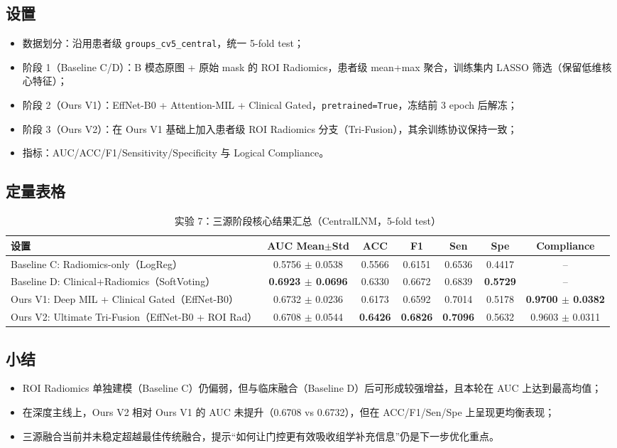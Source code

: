\documentclass[12pt,a4paper]{ctexart}
\begin{document}
\subsection{设置}
\begin{itemize}
  \item 数据划分：沿用患者级 \texttt{groups\_cv5\_central}，统一 5-fold test；
  \item 阶段 1（Baseline C/D）：B 模态原图 + 原始 mask 的 ROI Radiomics，患者级 mean+max 聚合，训练集内 LASSO 筛选（保留低维核心特征）；
  \item 阶段 2（Ours V1）：EffNet-B0 + Attention-MIL + Clinical Gated，\texttt{pretrained=True}，冻结前 3 epoch 后解冻；
  \item 阶段 3（Ours V2）：在 Ours V1 基础上加入患者级 ROI Radiomics 分支（Tri-Fusion），其余训练协议保持一致；
  \item 指标：AUC/ACC/F1/Sensitivity/Specificity 与 Logical Compliance。
\end{itemize}

\subsection{定量表格}
\begin{table}[H]
\centering
\caption{实验 7：三源阶段核心结果汇总（CentralLNM，5-fold test）}
\begin{tabular}{lcccccc}
\toprule
设置 & AUC Mean$\pm$Std & ACC & F1 & Sen & Spe & Compliance \\
\midrule
Baseline C: Radiomics-only（LogReg） & 0.5756 $\pm$ 0.0538 & 0.5566 & 0.6151 & 0.6536 & 0.4417 & -- \\
Baseline D: Clinical+Radiomics（SoftVoting） & \textbf{0.6923 $\pm$ 0.0696} & 0.6330 & 0.6672 & 0.6839 & \textbf{0.5729} & -- \\
Ours V1: Deep MIL + Clinical Gated（EffNet-B0） & 0.6732 $\pm$ 0.0236 & 0.6173 & 0.6592 & 0.7014 & 0.5178 & \textbf{0.9700 $\pm$ 0.0382} \\
Ours V2: Ultimate Tri-Fusion（EffNet-B0 + ROI Rad） & 0.6708 $\pm$ 0.0544 & \textbf{0.6426} & \textbf{0.6826} & \textbf{0.7096} & 0.5632 & 0.9603 $\pm$ 0.0311 \\
\bottomrule
\end{tabular}
\end{table}

\subsection{小结}
\begin{itemize}
  \item ROI Radiomics 单独建模（Baseline C）仍偏弱，但与临床融合（Baseline D）后可形成较强增益，且本轮在 AUC 上达到最高均值；
  \item 在深度主线上，Ours V2 相对 Ours V1 的 AUC 未提升（0.6708 vs 0.6732），但在 ACC/F1/Sen/Spe 上呈现更均衡表现；
  \item 三源融合当前并未稳定超越最佳传统融合，提示“如何让门控更有效吸收组学补充信息”仍是下一步优化重点。
\end{itemize}
\end{document}
